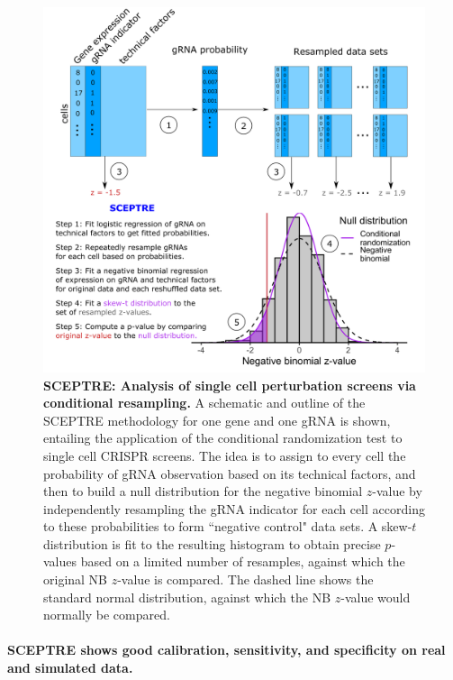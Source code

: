 \documentclass{nature}
\begin{document}
\thispagestyle{empty}
\begin{figure}[h!]
	\includegraphics[width = \textwidth]{figures/Figure2/Figure2.png}
	\caption{\textbf{SCEPTRE: Analysis of single cell perturbation screens via conditional resampling.} A schematic and outline of the SCEPTRE methodology for one gene and one gRNA is shown, entailing the application of the conditional randomization test\cite{CetL16} to single cell CRISPR screens. The idea is to assign to every cell the probability of gRNA observation based on its technical factors, and then to build a null distribution for the negative binomial $z$-value by independently resampling the gRNA indicator for each cell according to these probabilities to form ``negative control" data sets. A skew-$t$ distribution is fit to the resulting histogram to obtain precise $p$-values based on a limited number of resamples, against which the original NB $z$-value is compared. The dashed line shows the standard normal distribution, against which the NB $z$-value would normally be compared.}
	\label{fig:method}
\end{figure}

\paragraph{SCEPTRE shows good calibration, sensitivity, and specificity on real and simulated data.} 
\end{document}
